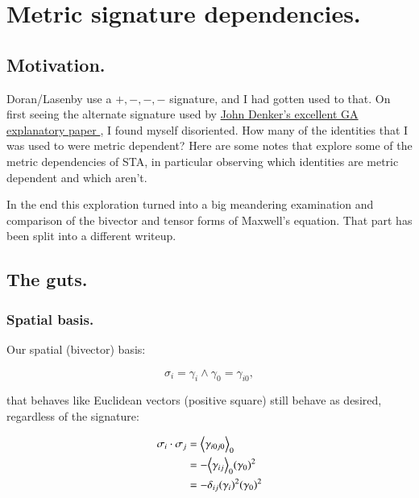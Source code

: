\chapter{Metric signature dependencies.}
\label{chap:emBivectorMetricDependencies}
\date{ Sept 5, 2008.  $RCSfile: emBivectorMetricDependencies.tex,v $ Last $Revision: 1.25 $ $Date: 2009/06/14 17:59:59 $ }

\section{Motivation. }

Doran/Lasenby use a $+,-,-,-$ signature, and I had gotten used to that.  On first seeing the alternate signature used by 
\href{http://www.av8n.com/physics/maxwell-ga.pdf}{ John Denker's excellent GA explanatory paper }, 
I found myself disoriented.  How many of the identities that I was used to were metric dependent?   Here are some notes that explore some of the
metric dependencies of STA, in particular observing which identities are metric dependent and which aren't.

In the end this exploration turned into a big meandering examination and comparison of the bivector and tensor forms of Maxwell's equation.  That part has been split into a different writeup.

\section{The guts. }

\subsection{Spatial basis. }

Our spatial (bivector) basis:

\begin{equation*}
\sigma_i = \gamma_i \wedge \gamma_0 = \gamma_{i0},
\end{equation*}

that behaves like Euclidean vectors (positive square) still behave as desired, regardless of the signature:

\begin{align*}
\sigma_i \cdot \sigma_j
&= {\left\langle{{\gamma_{i0j0}}}\right\rangle}_{0}  \\
&= - {\left\langle{{\gamma_{ij}}}\right\rangle}_{0} (\gamma_{0})^2  \\
&= -\delta_{ij} (\gamma_i)^2 (\gamma_{0})^2
\end{align*}

